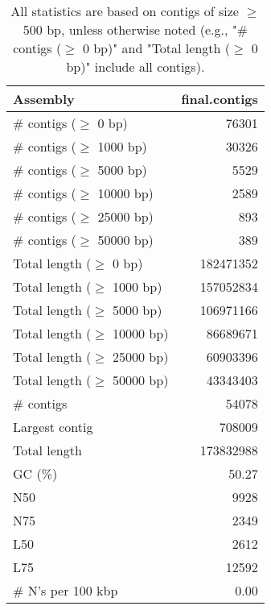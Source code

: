 \documentclass[12pt,a4paper]{article}
\begin{document}
\begin{table}[ht]
\begin{center}
\caption{All statistics are based on contigs of size $\geq$ 500 bp, unless otherwise noted (e.g., "\# contigs ($\geq$ 0 bp)" and "Total length ($\geq$ 0 bp)" include all contigs).}
\begin{tabular}{|l*{1}{|r}|}
\hline
Assembly & final.contigs \\ \hline
\# contigs ($\geq$ 0 bp) & 76301 \\ \hline
\# contigs ($\geq$ 1000 bp) & 30326 \\ \hline
\# contigs ($\geq$ 5000 bp) & 5529 \\ \hline
\# contigs ($\geq$ 10000 bp) & 2589 \\ \hline
\# contigs ($\geq$ 25000 bp) & 893 \\ \hline
\# contigs ($\geq$ 50000 bp) & 389 \\ \hline
Total length ($\geq$ 0 bp) & 182471352 \\ \hline
Total length ($\geq$ 1000 bp) & 157052834 \\ \hline
Total length ($\geq$ 5000 bp) & 106971166 \\ \hline
Total length ($\geq$ 10000 bp) & 86689671 \\ \hline
Total length ($\geq$ 25000 bp) & 60903396 \\ \hline
Total length ($\geq$ 50000 bp) & 43343403 \\ \hline
\# contigs & 54078 \\ \hline
Largest contig & 708009 \\ \hline
Total length & 173832988 \\ \hline
GC (\%) & 50.27 \\ \hline
N50 & 9928 \\ \hline
N75 & 2349 \\ \hline
L50 & 2612 \\ \hline
L75 & 12592 \\ \hline
\# N's per 100 kbp & 0.00 \\ \hline
\end{tabular}
\end{center}
\end{table}
\end{document}
